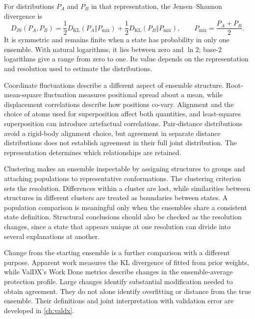 For distributions $P_A$ and $P_B$ in that representation, the Jensen--Shannon divergence is
\begin{equation}
    D_{\text{JS}}(P_A,P_B)=
    \frac{1}{2}D_{\text{KL}}(P_A\Vert P_{\text{mix}})
    +\frac{1}{2}D_{\text{KL}}(P_B\Vert P_{\text{mix}}),
    \qquad P_{\text{mix}}=\frac{P_A+P_B}{2}.
    \label{eq:bg-jsd}
\end{equation}
It is symmetric and remains finite when a state has probability in only one ensemble. With natural logarithms, it lies between zero and $\ln2$; base-2 logarithms give a range from zero to one.\supercite{lindorff-larsenSimilarityMeasuresProtein2009,tibertiENCORESoftwareQuantitative2015} Its value depends on the representation and resolution used to estimate the distributions.

Coordinate fluctuations describe a different aspect of ensemble structure. Root-mean-square fluctuation measures positional spread about a mean, while displacement correlations describe how positions co-vary. Alignment and the choice of atoms used for superposition affect both quantities, and least-squares superposition can introduce artefactual correlations.\supercite{bmsb2012ch8} Pair-distance distributions avoid a rigid-body alignment choice, but agreement in separate distance distributions does not establish agreement in their full joint distribution. The representation determines which relationships are retained.

Clustering makes an ensemble inspectable by assigning structures to groups and attaching populations to representative conformations. The clustering criterion sets the resolution. Differences within a cluster are lost, while similarities between structures in different clusters are treated as boundaries between states.\supercite{lindorff-larsenSimilarityMeasuresProtein2009} A population comparison is meaningful only when the ensembles share a consistent state definition. Structural conclusions should also be checked as the resolution changes, since a state that appears unique at one resolution can divide into several explanations at another.

Change from the starting ensemble is a further comparison with a different purpose. Apparent work measures the KL divergence of fitted from prior weights, while ValDX's Work Done metrics describe changes in the ensemble-average protection profile.\supercite{bradshawInterpretationHDXData2020,siddiquiFrameworkTestingStructural2026} Large changes identify substantial modification needed to obtain agreement. They do not alone identify overfitting or distance from the true ensemble. Their definitions and joint interpretation with validation error are developed in \cref{ch:valdx}.

